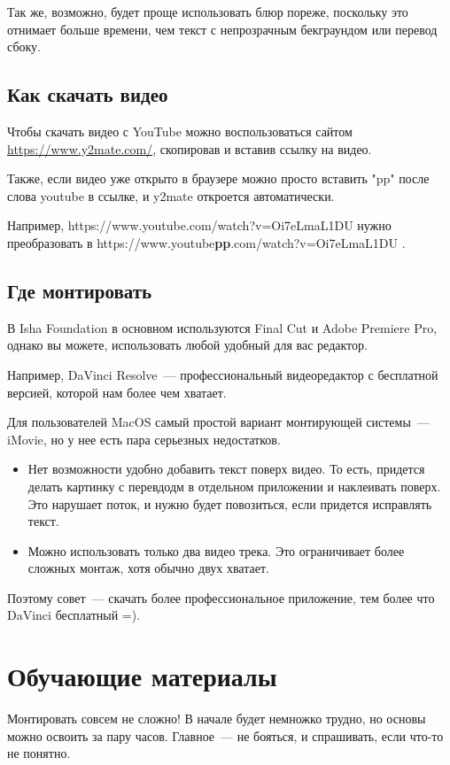 \documentclass[
a4paper, %
12pt, %
article,
onecolumn, %
openany, %
]{memoir}
\begin{document}
Так же, возможно, будет проще использовать блюр пореже, поскольку это отнимает 
больше времени, чем текст с непрозрачным бекграундом или перевод сбоку.

\subsection{Как скачать видео}
Чтобы скачать видео с YouTube можно воспользоваться сайтом
\href{https://www.y2mate.com/}{https://www.y2mate.com/}, скопировав и вставив
ссылку на видео.

Также, если видео уже открыто в браузере можно просто вставить "pp" после
слова youtube в ссылке, и y2mate откроется автоматически.

Например, https://www.youtube.com/watch?v=Oi7eLmaL1DU нужно преобразовать
в https://www.youtube\textbf{pp}.com/watch?v=Oi7eLmaL1DU .

\subsection{Где монтировать}
В Isha Foundation в основном используются Final Cut и Adobe Premiere Pro,
однако вы можете, использовать любой удобный для вас редактор.

Например, DaVinci Resolve~---
профессиональный видеоредактор с бесплатной версией, которой нам более чем хватает.

Для пользователей MacOS самый простой вариант монтирующей системы~---
iMovie, но у нее есть пара серьезных недостатков.
\begin{itemize}
    \item Нет возможности удобно добавить текст поверх видео.
        То есть, придется делать
        картинку с перевдодм в отдельном приложении и наклеивать поверх.
        Это нарушает поток, и нужно будет повозиться, если придется исправлять текст.
    \item Можно использовать только два видео трека. Это ограничивает более
        сложных монтаж, хотя обычно двух хватает.
\end{itemize}
Поэтому совет~--- скачать более профессиональное приложение, тем более что
DaVinci бесплатный =).




\newpage
\section{Обучающие материалы}

Монтировать совсем не сложно! В начале будет немножко трудно, но основы можно
освоить за пару часов. Главное~--- не бояться, и спрашивать, если что-то не понятно.
\end{document}
